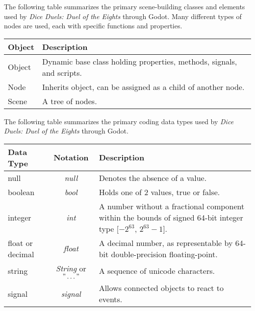 \documentclass[12pt, titlepage]{article}
\begin{document}
The following table summarizes the primary scene-building classes and elements used by \textit{Dice Duels: Duel of the Eights} through Godot. Many different types of nodes are used, each with specific functions and properties.

\begin{center}
\renewcommand{\arraystretch}{1.2}
\noindent 
\begin{tabular}{l l} 
\toprule 
\textbf{Object} & \textbf{Description}\\ 
\midrule
Object & Dynamic base class holding properties, methods, signals, and scripts.\\
Node & Inherits object, can be assigned as a child of another node.\\
Scene & A tree of nodes.\\
\bottomrule
\end{tabular} 
\end{center}

The following table summarizes the primary coding data types used by \textit{Dice Duels: Duel of the Eights} through Godot.

\begin{center}
\renewcommand{\arraystretch}{1.2}
\noindent 
\begin{tabular}{p{1.5cm} c p{10cm}} 
\toprule 
\textbf{Data Type} & \textbf{Notation} & \textbf{Description}\\ 
\midrule
null & \textit{null} & Denotes the absence of a value. \\
boolean & \textit{bool} & Holds one of 2 values, true or false.\\
integer & \textit{int} & A number without a fractional component within the bounds of signed 64-bit integer type [$-2^{63}$, $2^{63} - 1$].\\
float or decimal & \textit{float} & A decimal number, as representable by 64-bit double-precision floating-point.\\
string & \textit{String} or $"\dots"$ & A sequence of unicode characters.\\
signal & \textit{signal} & Allows connected objects to react to events.\\
\bottomrule
\end{tabular} 
\end{center}
\end{document}
